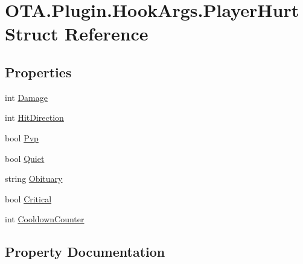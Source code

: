 \hypertarget{struct_o_t_a_1_1_plugin_1_1_hook_args_1_1_player_hurt}{}\section{O\+T\+A.\+Plugin.\+Hook\+Args.\+Player\+Hurt Struct Reference}
\label{struct_o_t_a_1_1_plugin_1_1_hook_args_1_1_player_hurt}
\subsection*{Properties}
\begin{DoxyCompactItemize}
\item 
int \hyperlink{struct_o_t_a_1_1_plugin_1_1_hook_args_1_1_player_hurt_aa2f89691696746d24ee65d86d7a226c3}{Damage}
\item 
int \hyperlink{struct_o_t_a_1_1_plugin_1_1_hook_args_1_1_player_hurt_a67b104055d712bdfdc461466bf55f978}{Hit\+Direction}
\item 
bool \hyperlink{struct_o_t_a_1_1_plugin_1_1_hook_args_1_1_player_hurt_aae5c17dd196eecb5c5b4583decb8fd7d}{Pvp}
\item 
bool \hyperlink{struct_o_t_a_1_1_plugin_1_1_hook_args_1_1_player_hurt_ac3247c511ac49e7f53756fe142b7bda7}{Quiet}
\item 
string \hyperlink{struct_o_t_a_1_1_plugin_1_1_hook_args_1_1_player_hurt_af4ea247e6e63385e32ae92e5ffc35a11}{Obituary}
\item 
bool \hyperlink{struct_o_t_a_1_1_plugin_1_1_hook_args_1_1_player_hurt_a8d239f903429948236ce0ffed261b20c}{Critical}
\item 
int \hyperlink{struct_o_t_a_1_1_plugin_1_1_hook_args_1_1_player_hurt_a5907cc774aaa4db95ae5c79d71df04bd}{Cooldown\+Counter}
\end{DoxyCompactItemize}


\subsection{Property Documentation}
\hypertarget{struct_o_t_a_1_1_plugin_1_1_hook_args_1_1_player_hurt_a5907cc774aaa4db95ae5c79d71df04bd}{}
